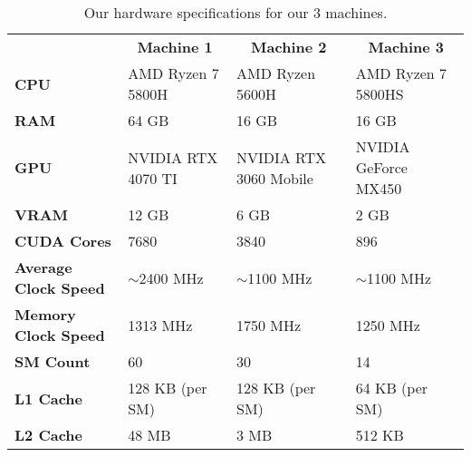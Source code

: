 \begin{table}[h]
\caption{Our hardware specifications for our 3 machines.}
\label{table:hardware}
\begin{adjustbox}{width=\columnwidth,center}
\begin{tabular}{llll}
 & \multicolumn{1}{c}{\textbf{Machine 1}}  & \multicolumn{1}{c}{\textbf{Machine 2}}      & \multicolumn{1}{c}{{\color[HTML]{000000} \textbf{Machine 3}}} \\ \cline{2-4} 
\multicolumn{1}{l|}{\textbf{CPU}}               & \multicolumn{1}{l|}{AMD Ryzen 7 5800H}  & \multicolumn{1}{l|}{AMD Ryzen 5600H}        & \multicolumn{1}{l|}{AMD Ryzen 7 5800HS}                       \\ \cline{2-4} 
\multicolumn{1}{l|}{\textbf{RAM}}               & \multicolumn{1}{l|}{64 GB}              & \multicolumn{1}{l|}{16 GB}                  & \multicolumn{1}{l|}{16 GB}                                    \\ \cline{2-4} 
\multicolumn{1}{l|}{\textbf{GPU}}               & \multicolumn{1}{l|}{NVIDIA RTX 4070 TI} & \multicolumn{1}{l|}{NVIDIA RTX 3060 Mobile} & \multicolumn{1}{l|}{NVIDIA GeForce MX450}                     \\ \cline{2-4} 
\multicolumn{1}{l|}{\textbf{VRAM}}              & \multicolumn{1}{l|}{12 GB}              & \multicolumn{1}{l|}{6 GB}                   & \multicolumn{1}{l|}{2 GB}                                     \\ \cline{2-4} 
\multicolumn{1}{l|}{\textbf{CUDA Cores}}   & \multicolumn{1}{l|}{7680}               & \multicolumn{1}{l|}{3840}                   & \multicolumn{1}{l|}{896}                                      \\ \cline{2-4} 
\multicolumn{1}{l|}{\textbf{Average Clock Speed}}          & \multicolumn{1}{l|}{$\sim$2400 MHz}                 & \multicolumn{1}{l|}{$\sim$1100 MHz}                     & \multicolumn{1}{l|}{$\sim$1100 MHz}                                       \\ \cline{2-4}
\multicolumn{1}{l|}{\textbf{Memory Clock Speed}}          & \multicolumn{1}{l|}{1313 MHz}                 & \multicolumn{1}{l|}{1750 MHz}                     & \multicolumn{1}{l|}{1250 MHz}                                       \\ \cline{2-4}
\multicolumn{1}{l|}{\textbf{SM Count}}          & \multicolumn{1}{l|}{60}                 & \multicolumn{1}{l|}{30}                     & \multicolumn{1}{l|}{14}                                       \\ \cline{2-4} 
\multicolumn{1}{l|}{\textbf{L1 Cache}}          & \multicolumn{1}{l|}{128 KB (per SM)}    & \multicolumn{1}{l|}{128 KB (per SM)}        & \multicolumn{1}{l|}{64 KB (per SM)}                           \\ \cline{2-4} 
\multicolumn{1}{l|}{\textbf{L2 Cache}}          & \multicolumn{1}{l|}{48 MB}              & \multicolumn{1}{l|}{3 MB}                   & \multicolumn{1}{l|}{512 KB}                                   \\ \cline{2-4} 
\end{tabular}
\end{adjustbox}
\end{table}

